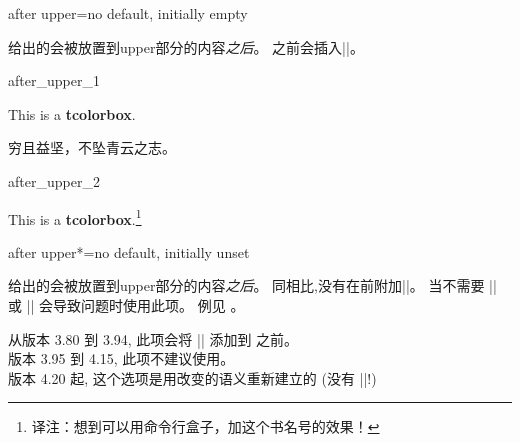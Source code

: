 




\begin{docTcbKey}[][doc updated=2016-10-21]{after upper}{=}{no default, initially empty}

给出的会被放置到upper部分的内容\emph{之后}。
之前会插入|\unskip|。

\begin{exdispExample}{after_upper_1}

\begin{tcolorbox}[title=My title]
This is a \textbf{tcolorbox}.
\end{tcolorbox}

\begin{tcolorbox}[after upper={\par\hfill---\textit{王勃}}]
穷且益坚，不坠青云之志。
\end{tcolorbox}
\end{exdispExample}

\begin{exdispExample}{after_upper_2}
\begin{tcolorbox}[before upper=\flqq,after upper=\frqq,
  colback=red!5!white,colframe=red!75!black]
This is a \textbf{tcolorbox}.\footnote{译注：想到可以用命令行盒子，加这个书名号的效果！}
\end{tcolorbox}
\end{exdispExample}
\end{docTcbKey}




\begin{docTcbKey}[][doc new and updated={2016-10-21}{2019-02-28}]{after upper*}{=}{no default, initially unset}

给出的会被放置到upper部分的内容\emph{之后}。%
同相比,没有在前附加|\unskip|。%
当不需要 |\unskip| 或 |\unskip| 会导致问题时使用此项。%
例见 。

\begin{marker}
从版本 3.80 到 3.94, 此项会将 |\unskip| 添加到  之前。\\
版本 3.95 到 4.15, 此项不建议使用。\\
版本 4.20 起, 这个选项是用改变的语义重新建立的 (没有 |\unskip|!)
\end{marker}
\end{docTcbKey}





